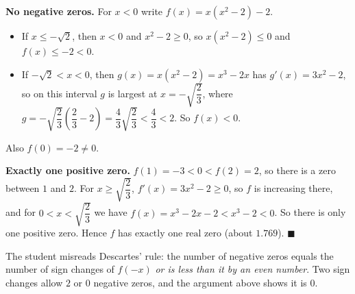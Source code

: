 \textbf{No negative zeros.} For $x<0$ write $f(x)=x(x^2-2)-2$.
\begin{itemize}
\item If $x\le-\sqrt2$, then $x<0$ and $x^2-2\ge0$, so $x(x^2-2)\le0$ and $f(x)\le-2<0$.
\item If $-\sqrt2<x<0$, then $g(x)=x(x^2-2)=x^3-2x$ has $g'(x)=3x^2-2$, so on this interval $g$ is largest at $x=-\sqrt{\dfrac{2}{3}}$, where $g=-\sqrt{\dfrac{2}{3}}\left(\dfrac{2}{3}-2\right)=\dfrac{4}{3}\sqrt{\dfrac{2}{3}}<\dfrac{4}{3}<2$. So $f(x)<0$.
\end{itemize}
Also $f(0)=-2\ne0$.

\textbf{Exactly one positive zero.} $f(1)=-3<0<f(2)=2$, so there is a zero between $1$ and $2$. For $x\ge\sqrt{\dfrac{2}{3}}$, $f'(x)=3x^2-2\ge0$, so $f$ is increasing there, and for $0<x<\sqrt{\dfrac{2}{3}}$ we have $f(x)=x^3-2x-2<x^3-2<0$. So there is only one positive zero. Hence $f$ has $\boxed{\text{exactly one real zero}}$ (about $1.769$). $\blacksquare$

The student misreads Descartes' rule: the number of negative zeros equals the number of sign changes of $f(-x)$ \emph{or is less than it by an even number}. Two sign changes allow $2$ or $0$ negative zeros, and the argument above shows it is $0$.
